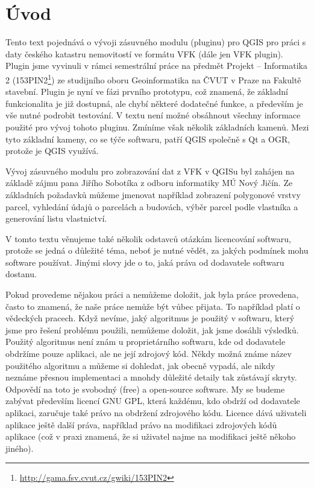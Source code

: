 \documentclass[a4paper,10pt]{article}
\begin{document}
\section{Úvod}
Tento text pojednává o vývoji zásuvného modulu (pluginu) pro QGIS pro práci s daty českého katastru nemovitostí ve formátu VFK (dále jen VFK plugin).
Plugin jsme vyvinuli v rámci semestrální práce na předmět Projekt -- Informatika 2 (153PIN2\footnote{\url{http://gama.fsv.cvut.cz/gwiki/153PIN2}}) ze studijního oboru Geoinformatika na ČVUT v Praze na Fakultě stavební.
Plugin je nyní ve fázi prvního prototypu, což znamená, že základní funkcionalita je již dostupná, ale chybí některé dodatečné funkce, a především je vše nutné podrobit testování.
V textu není možné obsáhnout všechny informace použité pro vývoj tohoto pluginu.
Zmíníme však několik základních kamenů.
Mezi tyto základní kameny, co se týče softwaru, patří QGIS společně s Qt a OGR, protože je QGIS využívá.

Vývoj zásuvného modulu pro zobrazování dat z VFK v QGISu byl zahájen na základě zájmu pana Jiřího Sobotíka z odboru informatiky MÚ Nový Jičín.
Ze základních požadavků můžeme jmenovat například zobrazení polygonové vrstvy parcel, vyhledání údajů o parcelách a budovách, výběr parcel podle vlastníka a generování listu vlastnictví.


V tomto textu věnujeme také několik odstavců otázkám licencování softwaru, protože se jedná o důležité téma, neboť je nutné vědět, za jakých podmínek mohu software používat.
Jinými slovy jde o to, jaká práva od dodavatele softwaru dostanu.

Pokud provedeme nějakou práci a nemůžeme doložit, jak byla práce provedena, často to znamená, že naše práce nemůže být vůbec přijata.
To například platí o vědeckých pracech.
Když nevíme, jaký algoritmus je použitý v softwaru, který jsme pro řešení problému použili, nemůžeme doložit, jak jsme dosáhli výsledků.
Použitý algoritmus není znám u proprietárního softwaru, kde od dodavatele obdržíme pouze aplikaci, ale ne její zdrojový kód.
Někdy možná známe název použitého algoritmu a můžeme si dohledat, jak obecně vypadá, ale nikdy neznáme přesnou implementaci a mnohdy důležité detaily tak zůstávají skryty.
Odpovědí na toto je svobodný (free) a open-source software.
My se budeme zabývat především licencí GNU GPL, která každému, kdo obdrží od dodavatele aplikaci, zaručuje také právo na obdržení zdrojového kódu.
Licence dává uživateli aplikace ještě další práva, například právo na modifikaci zdrojových kódů aplikace (což v praxi znamená, že si uživatel najme na modifikaci ještě někoho jiného).
\end{document}
